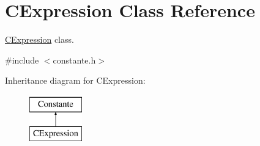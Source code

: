 \hypertarget{class_c_expression}{\section{C\-Expression Class Reference}
\label{class_c_expression}
}


\hyperlink{class_c_expression}{C\-Expression} class.  




{\ttfamily \#include $<$constante.\-h$>$}

Inheritance diagram for C\-Expression\-:\begin{figure}[H]
\begin{center}
\leavevmode
\includegraphics[height=2.000000cm]{class_c_expression}
\end{center}
\end{figure}
